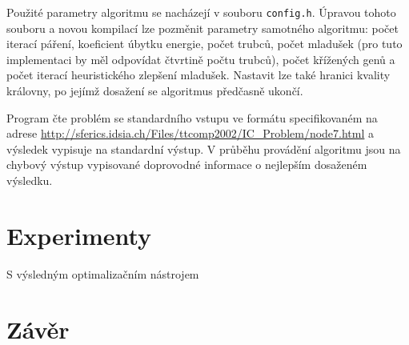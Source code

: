 \documentclass[12pt, a4paper]{article}
\begin{document}
Použité parametry algoritmu se nacházejí v souboru \texttt{config.h}. Úpravou tohoto souboru a novou kompilací
lze pozměnit parametry samotného algoritmu: počet iterací páření, koeficient úbytku energie, počet trubců, počet mladušek (pro tuto implementaci by měl odpovídat čtvrtině počtu trubců),
počet křížených genů a počet iterací heuristického zlepšení mladušek. Nastavit lze také hranici kvality královny, po jejímž dosažení se algoritmus předčasně ukončí.

Program čte problém se standardního vstupu ve formátu specifikovaném na adrese \url{http://sferics.idsia.ch/Files/ttcomp2002/IC_Problem/node7.html}
a výsledek vypisuje na standardní výstup.
V průběhu provádění algoritmu jsou na chybový výstup vypisované doprovodné informace o nejlepším dosaženém výsledku.

\section{Experimenty}
S výsledným optimalizačním nástrojem
\section{Závěr}
\end{document}

